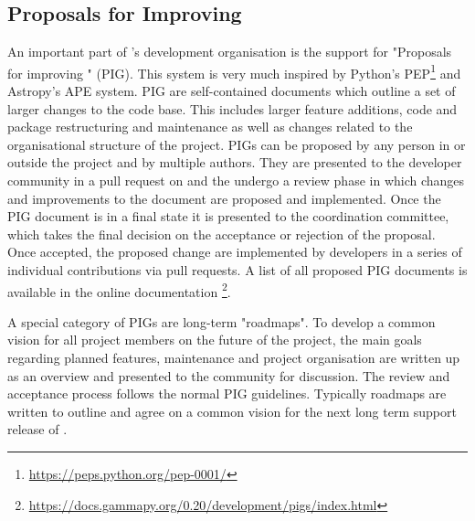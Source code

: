 \documentclass[traditabstract, longauth]{aa}
\begin{document}
\subsection{Proposals for Improving \gammapy}
\label{ssec:pigs}
An important part of \gammapy's development organisation is the support
for "Proposals for improving \gammapy" (PIG). This system is very much
inspired by Python's PEP\footnote{\url{https://peps.python.org/pep-0001/}}
and Astropy's APE \citep{greenfield_perry_2013} system.
PIG are self-contained documents which outline a set of larger
changes to the \gammapy code base. This includes larger feature additions,
code and package restructuring and maintenance as well as changes related
to the organisational structure of the \gammapy project. PIGs can be proposed
by any person in or outside the project and by multiple authors. They
are presented to the \gammapy developer community in a pull request
on \github and the undergo a review phase in which changes and
improvements to the document are proposed and implemented. Once the PIG
document is in a final state it is presented to the \gammapy
coordination committee, which takes the final decision on the
acceptance or rejection of the proposal. Once accepted, the proposed
change are implemented by \gammapy developers in a series of
individual contributions via pull requests. A list of all proposed
PIG documents is available in the \gammapy online documentation
\footnote{\url{https://docs.gammapy.org/0.20/development/pigs/index.html}}.

A special category of PIGs are long-term "roadmaps". To develop a common
vision for all \gammapy project members on the future of the
project, the main goals regarding planned features, maintenance and
project organisation are written up as an overview and presented to the
\gammapy community for discussion. The review and acceptance process
follows the normal PIG guidelines. Typically roadmaps are written
to outline and agree on a common vision for the next long term
support release of \gammapy.
\end{document}
